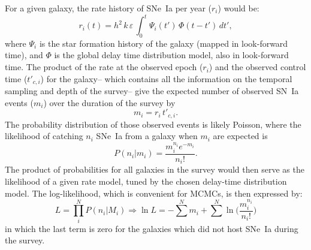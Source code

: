 \documentclass[apj]{aastex62}
\begin{document}
For a given galaxy, the rate history of SNe~Ia per year ($r_i$) would be:
\begin{equation}
r_i (t) = h^2\,k\,\varepsilon\, \int_0^t \Psi_i(t')\,\Phi(t-t')\,dt',
\label{eqn:rate_history}
\end{equation}
\noindent where $\Psi_i$ is the star formation history of the galaxy (mapped in look-forward time), and $\Phi$ is the global delay time distribution model, also in look-forward time. The product of the rate at the observed epoch ($r_i$) and the observed control time ($t'_{c, i}$) for the galaxy-- which contains all the information on the temporal sampling and depth of the survey--  give the expected number of observed SN~Ia events ($m_i$) over the duration of the survey by
\begin{equation}
m_i = r_i \, t'_{c, i}.
\end{equation}
\noindent The probability distribution of those observed events is likely Poisson, where the likelihood of catching $n_i$ SNe~Ia from a galaxy when $m_i$ are expected is
\begin{equation}
P(n_i | m_i) = \frac{m_i^{n_i}e^{-m_i}}{n_i!}.
\end{equation}
\noindent The product of probabilities for all galaxies in the survey would then serve as the likelihood of a given rate model, tuned by the chosen delay-time distribution model. The log-likelihood, which is convenient for MCMCs, is then expressed by:
\begin{equation}
L = \prod _i^N P(n_i|M_i) \Rightarrow \ln L = -\sum^N m_i+\sum^N\ln\biggl(\frac{m_i^{n_i}}{n_i!}\biggr)
\end{equation}
\noindent in which the last term is zero for the galaxies which did not host SNe~Ia during the survey.%
\end{document}
